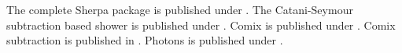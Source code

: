 \documentclass{article}
\begin{document}
The complete Sherpa package is published under \cite{Gleisberg:2008ta}.
The Catani-Seymour subtraction based shower is published under \cite{Schumann:2007mg}.
Comix is published under \cite{Gleisberg:2008fv}.
Comix subtraction is published in \cite{Hoeche:2012xx}.
Photons is published under \cite{Schonherr:2008av}.
\end{document}
